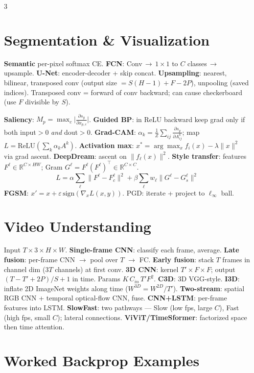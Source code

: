\documentclass[a4paper,9pt,landscape]{scrartcl}
\newcommand{\R}{\mathbb{R}}
\newcommand{\relu}{\mathrm{ReLU}}
\newcommand{\dd}[2]{\frac{\partial #1}{\partial #2}}
\begin{document}
\begin{multicols*}{3}
\section{Segmentation \& Visualization}
\textbf{Semantic} per-pixel softmax CE.
\textbf{FCN}: Conv\,$\to$\,$1{\times}1$ to $C$ classes\,$\to$ upsample. \textbf{U-Net}: encoder-decoder + skip concat.
\textbf{Upsampling}: nearest, bilinear, transposed conv (output size $= S(H{-}1)+F-2P$), unpooling (saved indices).
Transposed conv = forward of conv backward; can cause checkerboard (use $F$ divisible by $S$).

\textbf{Saliency}: $M_p=\max_c\big|\dd{s_y}{x_{p,c}}\big|$.
\textbf{Guided BP}: in ReLU backward keep grad only if both input$>0$ \emph{and} dout$>0$.
\textbf{Grad-CAM}: $\alpha_k=\tfrac1Z\sum_{ij}\dd{s_y}{A^k_{ij}}$;\; map $L=\relu(\sum_k\alpha_k A^k)$.
\textbf{Activation max}: $x^*=\arg\max_x f_i(x)-\lambda\|x\|^2$ via grad ascent.
\textbf{DeepDream}: ascent on $\|f_\ell(x)\|^2$.
\textbf{Style transfer}: features $F^\ell\!\in\!\R^{C\times HW}$; Gram $G^\ell=F^\ell(F^\ell)^\top\!\in\!\R^{C\times C}$.
$$L=\alpha\!\sum_\ell\!\|F^\ell{-}F^\ell_c\|^2+\beta\!\sum_\ell w_\ell\|G^\ell{-}G^\ell_s\|^2$$
\textbf{FGSM}: $x'=x+\varepsilon\,\mathrm{sign}(\nabla_x L(x,y))$. PGD: iterate + project to $\ell_\infty$ ball.

\section{Video Understanding}
Input $T\!\times\!3\!\times\!H\!\times\!W$.
\textbf{Single-frame CNN}: classify each frame, average.
\textbf{Late fusion}: per-frame CNN $\to$ pool over $T$ $\to$ FC.
\textbf{Early fusion}: stack $T$ frames in channel dim ($3T$ channels) at first conv.
\textbf{3D CNN}: kernel $T'\!\times\!F\!\times\!F$; output $(T{-}T'{+}2P)/S{+}1$ in time. Params $K\,C_{in}\,T'F^2$.
\textbf{C3D}: 3D VGG-style. \textbf{I3D}: inflate 2D ImageNet weights along time ($W^{3D}=W^{2D}/T'$).
\textbf{Two-stream}: spatial RGB CNN + temporal optical-flow CNN, fuse.
\textbf{CNN+LSTM}: per-frame features into LSTM.
\textbf{SlowFast}: two pathways — Slow (low fps, large $C$), Fast (high fps, small $C$); lateral connections.
\textbf{ViViT/TimeSformer}: factorized space then time attention.

\section{Worked Backprop Examples}

\end{multicols*}
\end{document}
